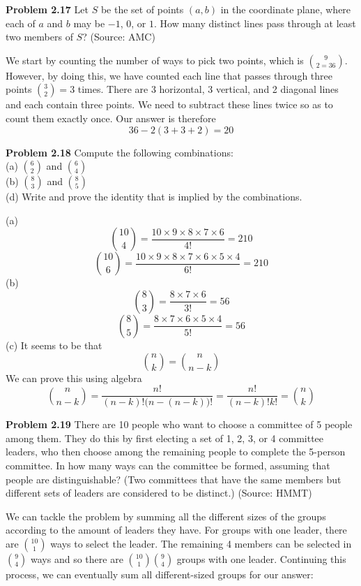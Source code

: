 \documentclass[11pt]{scrartcl}
\begin{document}
\begin{tcolorbox}
\textbf{Problem 2.17} Let $S$ be the set of points $(a,b)$ in the coordinate plane, where each of $a$ and $b$ may be $- 1$, $0$, or $1$. How many distinct lines pass through at least two members of $S$? (Source: AMC)
\end{tcolorbox}
\noindent 
We start by counting the number of ways to pick two points, which is $9 \choose 2=36$. However, by doing this, we have counted each line that passes through three points ${3 \choose 2}=3$ times. There are 3 horizontal, 3 vertical, and 2 diagonal lines and each contain three points. We need to subtract these lines twice so as to count them exactly once. Our answer is therefore 
$$36-2(3+3+2)=20$$
\begin{tcolorbox}
\textbf{Problem 2.18} Compute the following combinations:\\
(a) $6 \choose 2 $ and $6 \choose 4$\\
(b) $8 \choose 3$ and $8 \choose 5$\\
(d) Write and prove the identity that is implied by the combinations.
\end{tcolorbox}
\noindent 
(a) $${10 \choose 4}=\frac{10 \times 9 \times 8 \times 7 \times 6}{4!}=210$$
$${10 \choose 6}=\frac{10 \times 9 \times 8 \times 7 \times 6 \times 5 \times 4}{6!}=210$$
(b) $${8 \choose 3}=\frac{8 \times 7 \times 6}{3!}=56$$
$${8 \choose 5}=\frac{8 \times 7 \times 6 \times 5 \times 4}{5!}=56$$
(c) It seems to be that \
$${n \choose k}={n \choose {n-k}}$$
We can prove this using algebra 
$${n \choose {n-k}}=\frac{n!}{{(n-k)!}{(n-{(n-k))!}}}=\frac{n!}{{(n-k)!k!}}={n \choose k}$$
\begin{tcolorbox}
\textbf{Problem 2.19}  There are 10 people who want to choose a committee of 5 people among them. They do this by first
electing a set of 1, 2, 3, or 4 committee leaders, who then choose among the remaining people to
complete the 5-person committee. In how many ways can the committee be formed, assuming that
people are distinguishable? (Two committees that have the same members but different sets of leaders
are considered to be distinct.) (Source: HMMT)
\end{tcolorbox}
\noindent 
We can tackle the problem by summing all the different sizes of the groups according to the amount of leaders they have. For groups with one leader, there are $10 \choose 1$ ways to select the leader. The remaining 4 members can be selected in $9 \choose 4$ ways and so there are ${10 \choose 1}{9 \choose 4}$ groups with one leader. Continuing this process, we can eventually sum all different-sized groups for our answer: 
\end{document}

